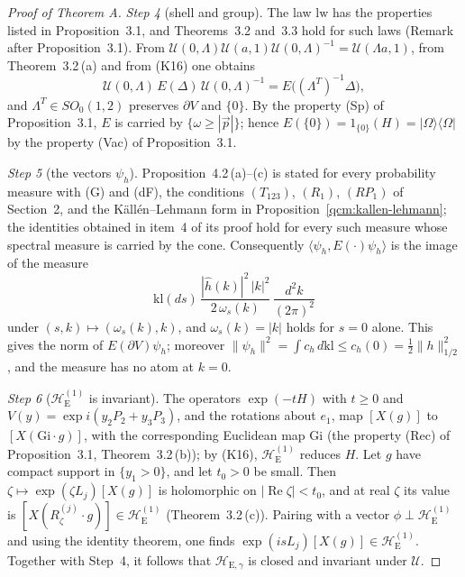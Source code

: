 \documentclass[11pt,letterpaper,reqno]{amsart}
\theoremstyle{definition}
\begin{document}
\begin{proof}[Proof of Theorem A]
\emph{Step 4} (shell and group).
The law $\mathrm{lw}$ has the properties listed in Proposition~3.1, and Theorems~3.2 and~3.3 hold for such laws (Remark after Proposition~3.1).
From $\mathcal U(0,\allowbreak \Lambda)\mathcal U(a,\allowbreak 1)\mathcal U(0,\allowbreak \Lambda)^{-1}=\allowbreak \mathcal U(\Lambda a,\allowbreak 1)$, from Theorem~3.2\,(a) and from (K16) one obtains
\begin{equation*}
\mathcal U(0,\Lambda)\,E(\Delta)\,\mathcal U(0,\Lambda)^{-1}=E\bigl((\Lambda^T)^{-1}\Delta\bigr),
\end{equation*}
and $\Lambda^T\in SO_0(1,2)$ preserves $\partial V$ and $\{0\}$.
By the property (Sp) of Proposition~3.1, $E$ is carried by $\{\omega\ge|\vec p|\}$;
hence $E(\{0\})=1_{\{0\}}(H)=|\Omega\rangle\langle\Omega|$ by the property (Vac) of Proposition~3.1.

\emph{Step 5} (the vectors $\psi_h$).
Proposition~4.2\,(a)--(c) is stated for every probability measure with (G) and (dF), the conditions $(T_{123})$, $(R_1)$, $(RP_1)$ of Section~2, and the K\"all\'en--Lehmann form in Proposition~\ref{qcm:kallen-lehmann};
the identities obtained in item~4 of its proof hold for every such measure whose spectral measure is carried by the cone.
Consequently $\langle\psi_h,E(\cdot)\psi_h\rangle$ is the image of the measure
\begin{equation*}
\mathrm{kl}(ds)\,\frac{|\hat h(k)|^2\,|k|^2}{2\,\omega_s(k)}\,\frac{d^2k}{(2\pi)^2}
\end{equation*}
under $(s,k)\mapsto(\omega_s(k),k)$, and $\omega_s(k)=|k|$ holds for $s=0$ alone.
This gives the norm of $E(\partial V)\psi_h$;
moreover $\|\psi_h\|^2=\allowbreak \int c_h\,\allowbreak d\mathrm{kl}\le c_h(0)=\allowbreak \frac12\|h\|_{1/2}^2$, and the measure has no atom at $k=0$.

\emph{Step 6} ($\mathcal H_{\mathrm E}^{(1)}$ is invariant).
The operators $\exp(-tH)$ with $t\ge0$ and $V(y)=\exp i(y_2P_2+y_3P_3)$, and the rotations about $e_1$, map $[X(g)]$ to $[X(\mathrm{Gi}\cdot g)]$, with the corresponding Euclidean map $\mathrm{Gi}$ (the property (Rec) of Proposition~3.1, Theorem~3.2\,(b));
by (K16), $\mathcal H_{\mathrm E}^{(1)}$ reduces $H$.
Let $g$ have compact support in $\{y_1>0\}$, and let $t_0>0$ be small.
Then $\zeta\mapsto\exp(\zeta L_j)[X(g)]$ is holomorphic on $|\operatorname{Re}\zeta|<t_0$, and at real $\zeta$ its value is $[X(R^{(j)}_\zeta\cdot g)]\in\mathcal H_{\mathrm E}^{(1)}$ (Theorem~3.2\,(c)).
Pairing with a vector $\phi\perp\mathcal H_{\mathrm E}^{(1)}$ and using the identity theorem, one finds $\exp(isL_j)[X(g)]\in\mathcal H_{\mathrm E}^{(1)}$.
Together with Step~4, it follows that $\mathcal H_{\mathrm E,\gamma}$ is closed and invariant under $\mathcal U$.


\end{proof}
\end{document}
